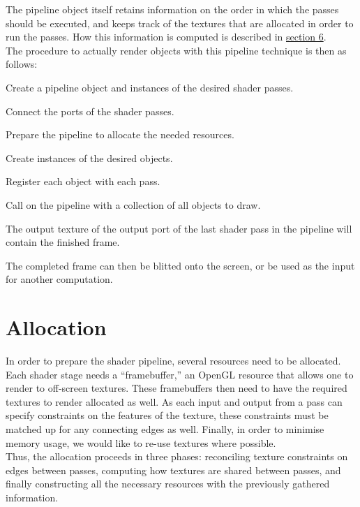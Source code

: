 \documentclass[format=sigconf]{acmart}
\begin{document}
The pipeline object itself retains information on the order in which the passes should be executed, and keeps track of the textures that are allocated in order to run the passes. How this information is computed is described in \hyperref[allocation]{section 6}. \\

The procedure to actually render objects with this pipeline technique is then as follows:

\begin{step}
\item Create a pipeline object and instances of the desired shader passes.
\item Connect the ports of the shader passes.
\item Prepare the pipeline to allocate the needed resources.
\item Create instances of the desired objects.
\item Register each object with each pass.
\item Call  on the pipeline with a collection of all objects to draw.
\item The output texture of the output port of the last shader pass in the pipeline will contain the finished frame.
\end{step}

The completed frame can then be blitted onto the screen, or be used as the input for another computation.

\section{Allocation}\label{allocation}
In order to prepare the shader pipeline, several resources need to be allocated. Each shader stage needs a ``framebuffer,'' an OpenGL resource that allows one to render to off-screen textures. These framebuffers then need to have the required textures to render allocated as well. As each input and output from a pass can specify constraints on the features of the texture, these constraints must be matched up for any connecting edges as well. Finally, in order to minimise memory usage, we would like to re-use textures where possible. \\

Thus, the allocation proceeds in three phases: reconciling texture constraints on edges between passes, computing how textures are shared between passes, and finally constructing all the necessary resources with the previously gathered information.
\end{document}
